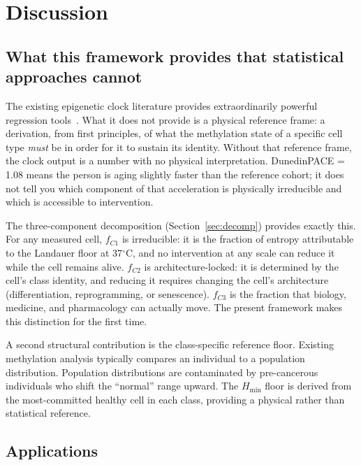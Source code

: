 \documentclass[12pt,a4paper]{article}
\newcommand{\Hmin}{H_{\min}}
\newcommand{\degreeC}{$^\circ$C}
\begin{document}
\section{Discussion}
\label{sec:discussion}

\subsection{What this framework provides that statistical approaches cannot}
\label{sec:novelty}

The existing epigenetic clock literature provides extraordinarily powerful
regression tools~\cite{Horvath2013,Lu2019,Belsky2022}. What it does not
provide is a physical reference frame: a derivation, from first principles,
of what the methylation state of a specific cell type \textit{must} be in
order for it to sustain its identity. Without that reference frame, the
clock output is a number with no physical interpretation. DunedinPACE = 1.08
means the person is aging slightly faster than the reference cohort; it does
not tell you which component of that acceleration is physically irreducible
and which is accessible to intervention.

The three-component decomposition (Section~\ref{sec:decomp}) provides
exactly this. For any measured cell, $f_{C1}$ is irreducible: it is the
fraction of entropy attributable to the Landauer floor at 37\degreeC, and
no intervention at any scale can reduce it while the cell remains alive.
$f_{C2}$ is architecture-locked: it is determined by the cell's class identity,
and reducing it requires changing the cell's architecture (differentiation,
reprogramming, or senescence). $f_{C3}$ is the fraction that biology, medicine,
and pharmacology can actually move. The present framework makes this distinction
for the first time.

A second structural contribution is the class-specific reference floor.
Existing methylation analysis typically compares an individual to a population
distribution. Population distributions are contaminated by pre-cancerous
individuals who shift the ``normal'' range upward. The $\Hmin$ floor is derived
from the most-committed healthy cell in each class, providing a physical
rather than statistical reference.

\subsection{Applications}
\end{document}
